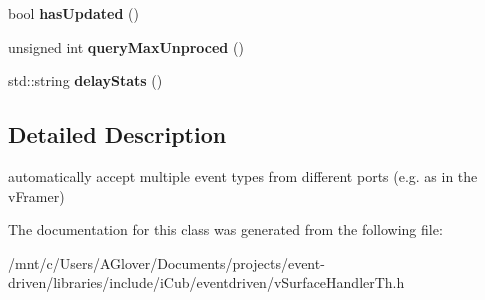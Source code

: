 \begin{DoxyCompactItemize}
\mbox{\label{classev_1_1syncvstreams_adff155da0d9cf739725127c446b1e575}} 
bool {\bfseries has\+Updated} ()
\item 
\mbox{\label{classev_1_1syncvstreams_a481bbbc4b4a0b4d7721e630da92de71c}} 
unsigned int {\bfseries query\+Max\+Unproced} ()
\item 
\mbox{\label{classev_1_1syncvstreams_a40bb750373f2b6d406e57bbd70bc40b1}} 
std\+::string {\bfseries delay\+Stats} ()
\end{DoxyCompactItemize}


\subsection{Detailed Description}
automatically accept multiple event types from different ports (e.\+g. as in the v\+Framer) 

The documentation for this class was generated from the following file\+:\begin{DoxyCompactItemize}
\item 
/mnt/c/\+Users/\+A\+Glover/\+Documents/projects/event-\/driven/libraries/include/i\+Cub/eventdriven/v\+Surface\+Handler\+Th.\+h\end{DoxyCompactItemize}
